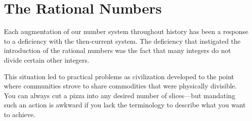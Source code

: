 \section{The Rational Numbers}
\label{sec:rationals}

Each augmentation of our number system throughout history has been a
response to a deficiency with the then-current system.  The deficiency
that instigated the introduction of the rational numbers was the fact
that many integers do not divide certain other integers.

This situation led to practical problems as civilization developed to
the point where communities strove to share commodities that were
physically divisible.  You can always cut a pizza into any desired
number of slices---but mandating such an action is awkward if you lack
the terminology to describe what you want to achieve.

